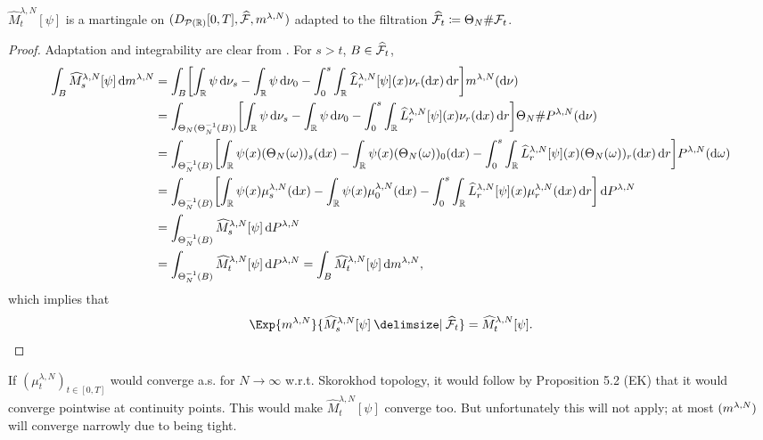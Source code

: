 \begin{corollary}\label{cor:hat-M-mart}
  $\widehat{M}_t^{\lambda, N}[\psi]$ is a martingale on $(D_{\mathcal{P}(\mathbb{R})}[0,T], \widehat{\mathcal{F}}, m^{\lambda,N})$ adapted to the filtration $\widehat{\mathcal{F}}_t \coloneqq \Theta_N \# \mathcal{F}_t$.
\end{corollary}
\begin{proof}
  Adaptation and integrability are clear from .
  For $s > t$, $B \in \widehat{\mathcal{F}}_t$,
  \begin{equation}
    \begin{split}
      \int_B \widehat{M}_{s}^{\lambda, N}[\psi] \odif{\lawmu^{\lambda,N}}
       & = \int_B \sbr*{ \int_\potspace \psi \odif{\nu_s} - \int_\potspace \psi \odif{\nu_0} - \int_0^s \int_\potspace \widehat{L}_r^{\lambda, N} [\psi](x) \nu_{r}(\odif{x}) \odif{r} } \lawmu^{\lambda,N} (\odif{\nu})                                                                          \\
       & = \int_{\Theta_N(\Theta_N^{-1}(B))} \sbr*{ \int_\potspace \psi \odif{\nu_s} - \int_\potspace \psi \odif{\nu_0} - \int_0^s \int_\potspace \widehat{L}_r^{\lambda, N} [\psi](x) \nu_{r}(\odif{x}) \odif{r} } \Theta_N \# P^{\lambda, N} (\odif{\nu})                                       \\
       & = \int_{\Theta_N^{-1}(B)} \sbr*{ \int_\potspace \psi(x) (\Theta_N(\omega))_s(\odif{x}) - \int_\potspace \psi(x) (\Theta_N(\omega))_0(\odif{x}) - \int_0^s \int_\potspace \widehat{L}_r^{\lambda, N} [\psi](x) (\Theta_N(\omega))_{r}(\odif{x}) \odif{r} } P^{\lambda, N} (\odif{\omega}) \\
       & = \int_{\Theta_N^{-1}(B)} \sbr*{ \int_\potspace \psi(x) \mu_s^{\lambda,N}(\odif{x}) - \int_\potspace \psi(x) \mu_0^{\lambda,N}(\odif{x}) - \int_0^s \int_\potspace \widehat{L}_r^{\lambda, N} [\psi](x) \mu_{r}^{\lambda,N}(\odif{x}) \odif{r} } \odif{P^{\lambda, N}}                   \\
       & = \int_{\Theta_N^{-1}(B)} \widehat{M}_s^{\lambda, N}[\psi] \odif{P^{\lambda, N}}                                                                                                                                                                                                         \\
       & = \int_{\Theta_N^{-1}(B)} \widehat{M}_t^{\lambda, N}[\psi] \odif{P^{\lambda, N}}
      = \int_B \widehat{M}_t^{\lambda, N}[\psi] \odif{\lawmu^{\lambda,N}},
    \end{split}
  \end{equation}
  which implies that
  \begin{equation}
    \Exp{\lawmu^{\lambda,N}}{\widehat{M}_{s}^{\lambda, N}[\psi] \given \widehat{\cF}_t} = \widehat{M}_t^{\lambda, N}[\psi].
  \end{equation}
\end{proof}


If $(\mu_t^{\lambda, N})_{t\in[0,T]}$ would converge a.s. for $N\to\infty$ w.r.t. Skorokhod topology, it would follow by Proposition 5.2 (EK) that it would converge pointwise at continuity points.
This would make $\widehat{M}_t^{\lambda, N}[\psi]$ converge too.
But unfortunately this will not apply; at most $(m^{\lambda,N})$ will converge narrowly due to being tight.